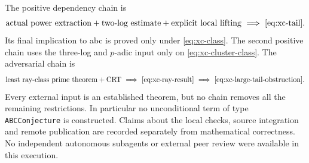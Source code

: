 The positive dependency chain is
\[
 \text{actual power extraction}+
 \text{two-log estimate}+
 \text{explicit local lifting}
 \ \Longrightarrow\ \eqref{eq:xc-tail}.
\]
Its final implication to abc is proved only under \eqref{eq:xc-class}.
The second positive chain uses the three-log and $p$-adic input only on
\eqref{eq:xc-cluster-class}. The adversarial chain is
\[
 \text{least ray-class prime theorem}+\text{CRT}
 \ \Longrightarrow\ \eqref{eq:xc-ray-result}
 \ \Longrightarrow\ \eqref{eq:xc-large-tail-obstruction}.
\]
Every external input is an established theorem, but no chain removes all
the remaining restrictions. In particular no unconditional term of type
\texttt{ABCConjecture} is constructed. Claims about the local checks,
source integration and remote publication are recorded separately from
mathematical correctness. No independent autonomous subagents or external
peer review were available in this execution.

